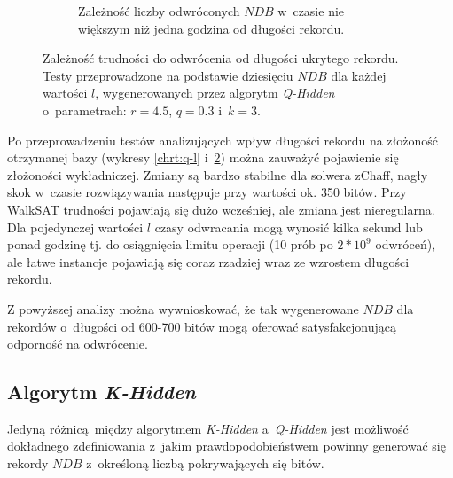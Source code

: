 \begin{figure}[!htb]
\begin{subfigure}{0.5\textwidth}
        \caption{Zależność liczby odwróconych $NDB$ w~czasie nie większym niż jedna godzina od długości rekordu.}
        \label{chrt:q-l1h}
    \end{subfigure}
    \caption{Zależność trudności do odwrócenia od długości ukrytego rekordu. Testy przeprowadzone na podstawie dziesięciu $NDB$ dla każdej wartości $l$, wygenerowanych przez algorytm \textit{Q-Hidden} o~parametrach:
        $r = 4.5$, $q = 0.3$ i~$k=3$.}
\end{figure}

Po przeprowadzeniu testów analizujących wpływ długości rekordu na złożoność otrzymanej bazy (wykresy \ref{chrt:q-l} i~\ref{chrt:q-l1h}) można zauważyć pojawienie się złożoności wykładniczej. Zmiany są bardzo stabilne dla solwera zChaff,
nagły skok w~czasie rozwiązywania następuje przy wartości ok. 350 bitów. Przy WalkSAT trudności pojawiają się dużo wcześniej, ale zmiana jest nieregularna. Dla pojedynczej wartości $l$ czasy odwracania mogą wynosić kilka sekund lub ponad godzinę tj.
do osiągnięcia limitu operacji (10 prób po $2*10^9$ odwróceń), ale łatwe instancje pojawiają się coraz rzadziej wraz ze wzrostem długości rekordu. 

Z powyższej analizy można wywnioskować, że tak wygenerowane $NDB$ dla rekordów o~długości od 600-700 bitów mogą oferować satysfakcjonującą odporność na odwrócenie. 



\subsection{Algorytm \textit{K-Hidden}} \label{sec:test-k-hidden}

Jedyną różnicą między algorytmem \textit{K-Hidden} a~\textit{Q-Hidden} jest możliwość dokładnego zdefiniowania z~jakim prawdopodobieństwem powinny generować się rekordy $NDB$ z~określoną liczbą pokrywających się bitów.

